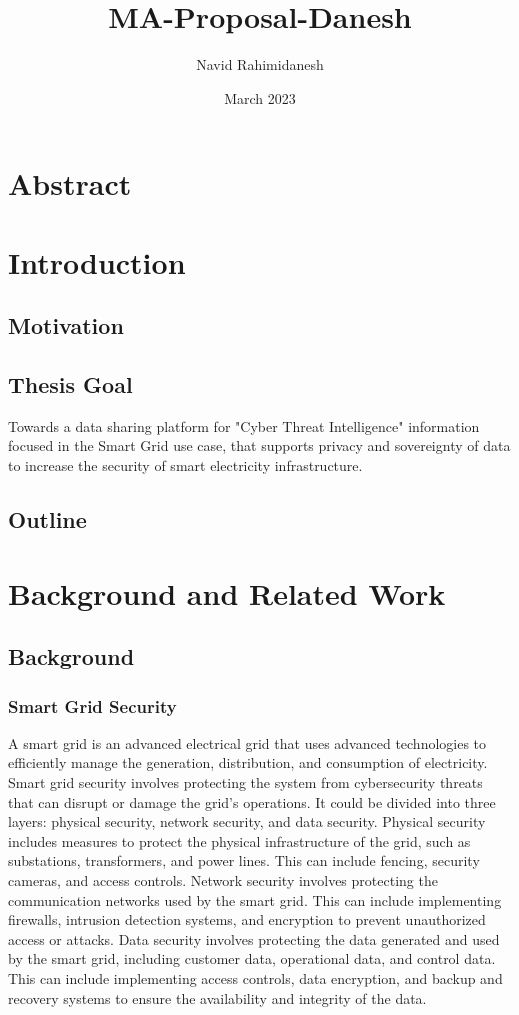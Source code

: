 \documentclass{article}
\title{MA-Proposal-Danesh}
\author{Navid Rahimidanesh}
\date{March 2023}
\begin{document}
\maketitle

\section{Abstract}

\section{Introduction} %

\subsection{Motivation}

\subsection{Thesis Goal}

Towards a data sharing platform for "Cyber Threat Intelligence" information focused in the Smart Grid use case, that supports privacy and sovereignty of data to increase the security of smart electricity infrastructure.

\subsection{Outline}


\section{Background and Related Work} %

\subsection*{Background}
\subsubsection*{Smart Grid Security}
A smart grid is an advanced electrical grid that uses advanced technologies to efficiently manage the generation, distribution, and consumption of electricity. Smart grid security involves protecting the system from cybersecurity threats that can disrupt or damage the grid's operations. It could be divided into three layers: physical security, network security, and data security. Physical security includes measures to protect the physical infrastructure of the grid, such as substations, transformers, and power lines. This can include fencing, security cameras, and access controls. Network security involves protecting the communication networks used by the smart grid. This can include implementing firewalls, intrusion detection systems, and encryption to prevent unauthorized access or attacks. Data security involves protecting the data generated and used by the smart grid, including customer data, operational data, and control data. This can include implementing access controls, data encryption, and backup and recovery systems to ensure the availability and integrity of the data. 
\end{document}
